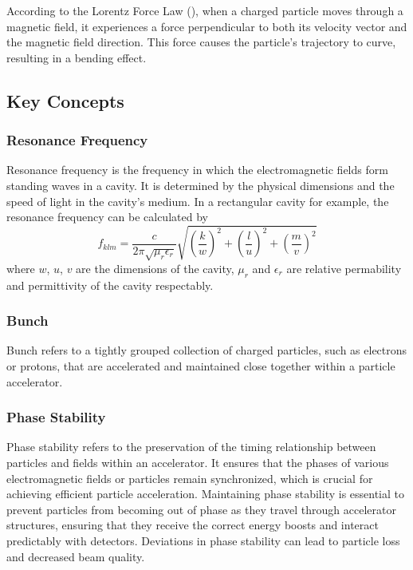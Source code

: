 \documentclass{article}
\begin{document}
According to the Lorentz Force Law (), when a charged particle moves through a magnetic field, it experiences a force perpendicular to both its velocity 
vector and the magnetic field direction. This force causes the particle's trajectory to curve, resulting in a bending effect.


\subsection{Key Concepts}

\subsubsection{Resonance Frequency}
Resonance frequency is the frequency in which the electromagnetic fields form standing waves in a cavity.
It is determined by the physical dimensions and the speed of light in the cavity's medium. 
In a rectangular cavity for example, the resonance frequency can be calculated by
\begin{equation}
    f_{klm} = \frac{c}{2\pi \sqrt{\mu_r \epsilon_r}} \sqrt{(\frac{k}{w})^2 + (\frac{l}{u})^2 + (\frac{m}{v})^2}
    \label{eq:f_r_rec}
\end{equation}
where $w$, $u$, $v$ are the dimensions of the cavity, $\mu_r$ and $\epsilon_r$ are relative permability and permittivity of the cavity respectably.

\subsubsection{Bunch}
Bunch refers to a tightly grouped collection of charged particles, such as electrons or protons, that are accelerated and maintained close together within a particle accelerator.

\subsubsection{Phase Stability}
Phase stability refers to the preservation of the timing relationship between particles and fields within an accelerator. 
It ensures that the phases of various electromagnetic fields or particles remain synchronized, 
which is crucial for achieving efficient particle acceleration. 
Maintaining phase stability is essential to prevent particles from becoming out of phase as they travel through accelerator structures, 
ensuring that they receive the correct energy boosts and interact predictably with detectors. 
Deviations in phase stability can lead to particle loss and decreased beam quality.
\end{document}
